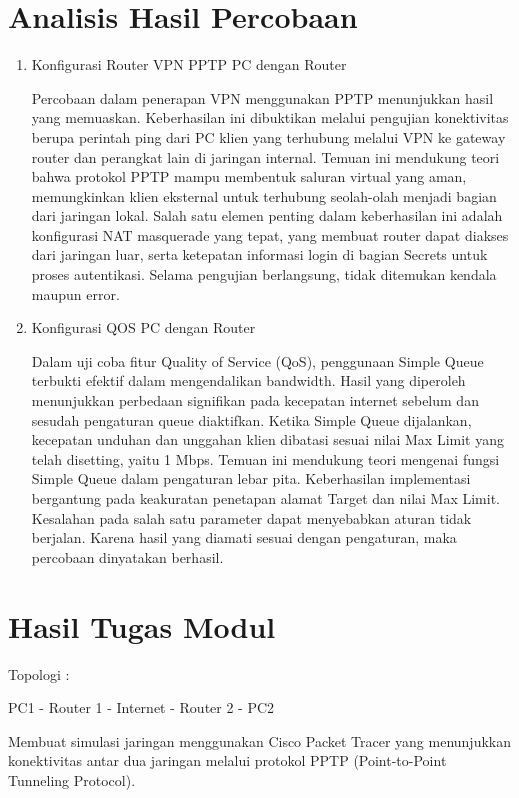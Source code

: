 \section{Analisis Hasil Percobaan}
\begin{enumerate}
    \item Konfigurasi Router VPN PPTP PC dengan Router
     
    Percobaan dalam penerapan VPN menggunakan PPTP menunjukkan hasil yang memuaskan. Keberhasilan ini dibuktikan melalui pengujian konektivitas berupa perintah ping dari PC klien yang terhubung melalui VPN ke gateway router dan perangkat lain di jaringan internal. Temuan ini mendukung teori bahwa protokol PPTP mampu membentuk saluran virtual yang aman, memungkinkan klien eksternal untuk terhubung seolah-olah menjadi bagian dari jaringan lokal. Salah satu elemen penting dalam keberhasilan ini adalah konfigurasi NAT masquerade yang tepat, yang membuat router dapat diakses dari jaringan luar, serta ketepatan informasi login di bagian Secrets untuk proses autentikasi. Selama pengujian berlangsung, tidak ditemukan kendala maupun error.
    
    \item Konfigurasi QOS PC dengan Router
    
    Dalam uji coba fitur Quality of Service (QoS), penggunaan Simple Queue terbukti efektif dalam mengendalikan bandwidth. Hasil yang diperoleh menunjukkan perbedaan signifikan pada kecepatan internet sebelum dan sesudah pengaturan queue diaktifkan. Ketika Simple Queue dijalankan, kecepatan unduhan dan unggahan klien dibatasi sesuai nilai Max Limit yang telah disetting, yaitu 1 Mbps. Temuan ini mendukung teori mengenai fungsi Simple Queue dalam pengaturan lebar pita. Keberhasilan implementasi bergantung pada keakuratan penetapan alamat Target dan nilai Max Limit. Kesalahan pada salah satu parameter dapat menyebabkan aturan tidak berjalan. Karena hasil yang diamati sesuai dengan pengaturan, maka percobaan dinyatakan berhasil.
\end{enumerate}
\section{Hasil Tugas Modul}
Topologi :

PC1 - Router 1 - Internet - Router 2 - PC2

Membuat simulasi jaringan menggunakan Cisco Packet Tracer yang menunjukkan konektivitas antar dua jaringan melalui protokol PPTP (Point-to-Point Tunneling Protocol).

